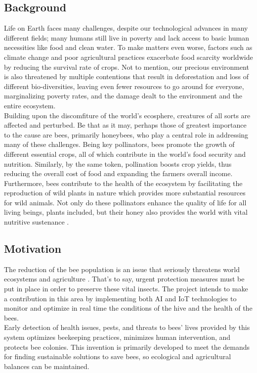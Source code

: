 \documentclass[12pt]{article}
\begin{document}
	\subsection{Background} 
	Life on Earth faces many challenges, despite our technological advances in many different fields; many humans still live in poverty and lack access to basic human necessities like food and clean water. To make matters even worse, factors such as climate change and poor agricultural practices exacerbate food scarcity worldwide by reducing the survival rate of crops. 
	Not to mention, our precious environment is also threatened by multiple contentions that result in deforestation and loss of different bio-diversities, leaving even fewer resources to go around for everyone, marginalizing poverty rates, and the damage dealt to the environment and the entire ecosystem. \\ \newline
	Building upon the discomfiture of the world's ecosphere, creatures of all sorts are affected and perturbed.
	Be that as it may, perhaps those of greatest importance to the cause are bees, primarily honeybees, who play a central role in addressing many of these challenges. Being key pollinators, bees promote the growth of different essential crops, all of which contribute in the world's food security and nutrition. Similarly, by the same token, pollination boosts crop yields, thus reducing the overall cost of food and expanding the farmers overall income. Furthermore, bees contribute to the health of the ecosystem by facilitating the reproduction of wild plants in nature which provides more substantial resources for wild animals. Not only do these pollinators enhance the quality of life for all living beings, plants included, but their honey also provides the world with vital nutritive sustenance \cite{hristov2020significance}.
	
	\subsection{Motivation}
	The reduction of the bee population is an issue that seriously threatens world ecosystems and agriculture . That's to say, urgent protection measures must be put in place in order to preserve these vital insects. The project intends to make a contribution in this area by implementing both AI and IoT technologies to monitor and optimize in real time the conditions of the hive and the health of the bees.\\ \newline
	Early detection of health issues, pests, and threats to bees' lives provided by this system optimizes beekeeping practices, minimizes human intervention, and protects bee colonies. This invention is primarily developed to meet the demands for finding sustainable solutions to save bees, so ecological and agricultural balances can be maintained.
	\vspace{0.5 cm}
\end{document}
